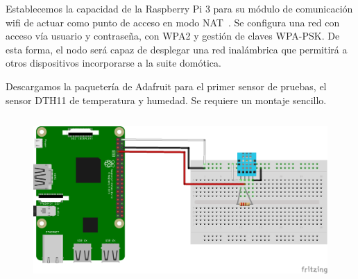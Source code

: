 Establecemos la capacidad de la Raspberry Pi 3 para su módulo de comunicación wifi de actuar como punto de acceso en modo NAT~\cite{raspberrypiasaccesspoint}. Se configura una red con acceso vía usuario y contraseña, con WPA2 y gestión de claves WPA-PSK. De esta forma, el nodo será capaz de desplegar una red inalámbrica que permitirá a otros dispositivos incorporarse a la suite domótica.

Descargamos la paquetería de Adafruit para el primer sensor de pruebas, el sensor DTH11 de temperatura y humedad.
Se requiere un montaje sencillo.
\begin{figure}[hbt!]
\centering
\includegraphics[height=2.5in]{figures/nodo_1.png}
\end{figure}

